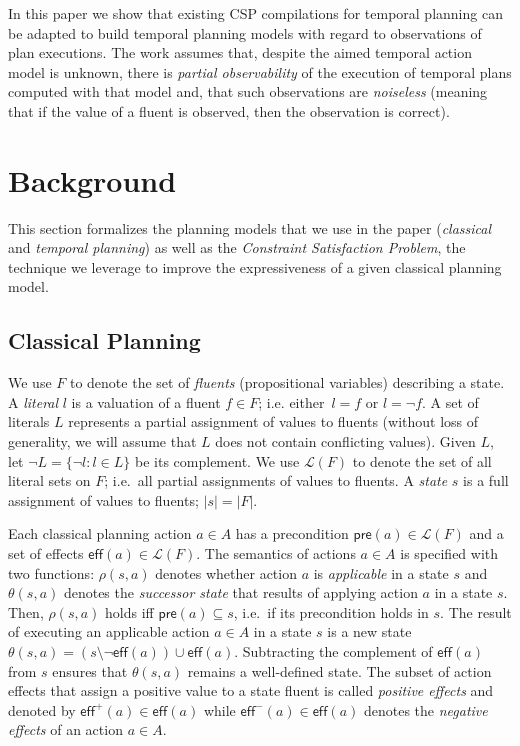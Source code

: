 \documentclass[letterpaper]{article} %
\newcommand{\pre}{\mathsf{pre}}     %
\newcommand{\eff}{\mathsf{eff}}     %
\begin{document}
In this paper we show that existing CSP compilations for temporal planning can be adapted to build temporal planning models with regard to observations of plan executions. The work assumes that, despite the aimed temporal action model is unknown, there is {\em partial observability} of the execution of temporal plans computed with that model and, that such observations are {\em noiseless} (meaning that if the value of a fluent is observed, then the observation is correct).



\section{Background}
\label{sec:background}
This section formalizes the planning models that we use in the paper ({\em classical} and {\em temporal planning}) as well as the {\em Constraint Satisfaction Problem}, the technique we leverage to improve the expressiveness of a given classical planning model.

\subsection{Classical Planning}
We use $F$ to denote the set of {\em fluents} (propositional variables) describing a state. A {\em literal} $l$ is a valuation of a fluent $f\in F$; i.e. either~$l=f$ or $l=\neg f$. A set of literals $L$ represents a partial assignment of values to fluents (without loss of generality, we will assume that $L$ does not contain conflicting values). Given $L$, let $\neg L=\{\neg l:l\in L\}$ be its complement. We use $\mathcal{L}(F)$ to denote the set of all literal sets on $F$; i.e.~all partial assignments of values to fluents. A {\em state} $s$ is a full assignment of values to fluents; $|s|=|F|$.

Each classical planning action $a\in A$ has a precondition $\pre(a)\in\mathcal{L}(F)$ and a set of effects $\eff(a)\in\mathcal{L}(F)$. The semantics of actions $a\in A$ is specified with two functions: $\rho(s,a)$ denotes whether action $a$ is {\em applicable} in a state $s$ and $\theta(s,a)$ denotes the {\em successor state} that results of applying action $a$ in a state $s$. Then, $\rho(s,a)$ holds iff $\pre(a)\subseteq s$, i.e.~if its precondition holds in $s$. The result of executing an applicable action $a\in A$ in a state $s$ is a new state $\theta(s,a)=(s\setminus \neg\eff(a))\cup\eff(a)$. Subtracting the complement of $\eff(a)$ from $s$ ensures that $\theta(s,a)$ remains a well-defined state. The subset of action effects that assign a positive value to a state fluent is called {\em positive effects} and denoted by $\eff^+(a)\in \eff(a)$ while $\eff^-(a)\in \eff(a)$ denotes the {\em negative effects} of an action $a\in A$.
\end{document}
